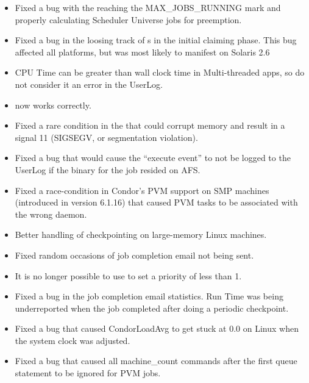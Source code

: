 \begin{itemize}

\item Fixed a bug with the  reaching the MAX\_JOBS\_RUNNING
mark and properly calculating Scheduler Universe jobs for preemption.

\item Fixed a bug in the  loosing track of s 
in the initial claiming phase. This bug affected all platforms, but was most
likely to manifest on Solaris 2.6

\item CPU Time can be greater than wall clock time in Multi-threaded
apps, so do not consider it an error in the UserLog.

\item {}  now works correctly.
 
\item Fixed a rare condition in the  that could corrupt
memory and result in a signal 11 (SIGSEGV, or segmentation violation).

\item Fixed a bug that would cause the ``execute event'' to not be
logged to the UserLog if the binary for the job resided on AFS.

\item Fixed a race-condition in Condor's PVM support on SMP machines
(introduced in version 6.1.16) that caused PVM tasks to be associated
with the wrong daemon.

\item Better handling of checkpointing on large-memory Linux machines.

\item Fixed random occasions of job completion email not being sent.

\item It is no longer possible to use  to set a priority of less
than 1.

\item Fixed a bug in the job completion email statistics.
Run Time was being underreported when the job completed after doing a
periodic checkpoint.

\item Fixed a bug that caused CondorLoadAvg to get stuck at 0.0 on
Linux when the system clock was adjusted.

\item Fixed a  bug that caused all machine\_count
commands after the first queue statement to be ignored for PVM jobs.


\end{itemize}
